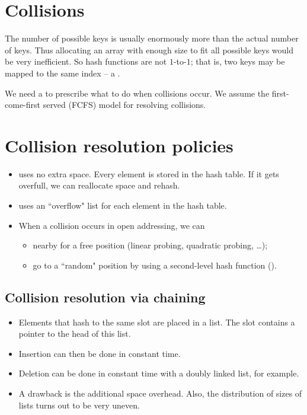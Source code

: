 \section{Collisions}
The number of possible keys is usually enormously more than the actual number of keys. 
Thus allocating an array with enough size to fit all possible keys would be very inefficient. 
So hash functions are not $1$-to-$1$; that is, two keys may be mapped to the same index -- a . 

We need a  to prescribe what to do when collisions occur. 
We assume the first-come-first served (FCFS) model for resolving collisions.

\section{Collision resolution policies}
\begin{itemize}
\item {} uses no extra space. Every element is stored in the hash table. 
If it gets overfull, we can reallocate space and rehash.
\item {} uses an ``overflow" list for each element in the hash table.
\item When a collision occurs in open addressing, we can 
	\begin{itemize}
		\item {} nearby for a free position (linear probing, quadratic probing, \ldots);
		\item go to a ``random" position by using a second-level hash function 
		().
	\end{itemize}
\end{itemize}

\subsection{Collision resolution via chaining}
\begin{itemize}
\item Elements that hash to the same slot are placed in a list. 
The slot contains a pointer to the head of this list. 
\item Insertion can then be done in constant time. 
\item Deletion can be done in constant time with a doubly linked list, for example. 
\item A drawback is the additional space overhead. Also, the distribution of 
sizes of lists turns out to be very uneven.
\end{itemize}

